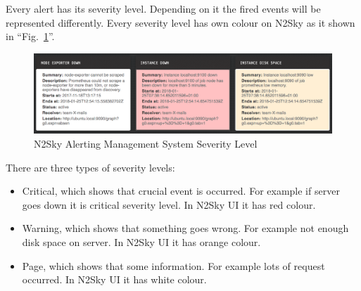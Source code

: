 Every alert has its severity level. Depending on it the fired events will be represented differently. Every severity level has own colour on N2Sky as it shown in ``Fig.~\ref{fig:alert_severity}''.

\begin{figure}[htbp]
\begin{center}
  \includegraphics[width=\linewidth]{components/3/alerts/alert_severity.png}
  \caption{N2Sky Alerting Management System Severity Level}
  \label{fig:alert_severity}
\end{center}
\end{figure}

There are three types of severity levels:
\begin{itemize}
\item Critical, which shows that crucial event is occurred. For example if server goes down it is critical severity level.  In N2Sky UI it has red colour. 
\item Warning, which shows that something goes wrong. For example not enough disk space on server. In N2Sky UI it has orange colour. 
\item Page, which shows that some information. For example lots of request occurred. In N2Sky UI it has white colour.  
\end{itemize}
 



